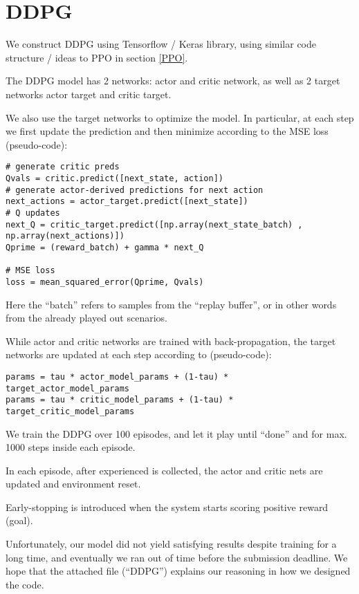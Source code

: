 \section{DDPG}\label{DDPG}

We construct DDPG using Tensorflow / Keras library, using similar code structure / ideas to PPO in section \ref{PPO}.

The DDPG model has 2 networks: actor and critic network, as well as 2 target networks actor target and critic target. 

We also use the target networks to optimize the model. In particular, at each step we first update the prediction and then minimize according to the MSE loss (pseudo-code):
\begin{lstlisting}
# generate critic preds
Qvals = critic.predict([next_state, action])
# generate actor-derived predictions for next action
next_actions = actor_target.predict([next_state])
# Q updates
next_Q = critic_target.predict([np.array(next_state_batch) , np.array(next_actions)])
Qprime = (reward_batch) + gamma * next_Q

# MSE loss
loss = mean_squared_error(Qprime, Qvals)
\end{lstlisting}

Here the ``batch'' refers to samples from the ``replay buffer'', or in other words from the already played out scenarios. 

While actor and critic networks are trained with back-propagation, the target networks are updated at each step according to (pseudo-code):
\begin{lstlisting}
params = tau * actor_model_params + (1-tau) * target_actor_model_params
params = tau * critic_model_params + (1-tau) * target_critic_model_params
\end{lstlisting}

We train the DDPG over 100 episodes, and let it play until ``done'' and for max. 1000 steps inside each episode.

In each episode, after experienced is collected, the actor and critic nets are updated and environment reset.

Early-stopping is introduced when the system starts scoring positive reward (goal).

Unfortunately, our model did not yield satisfying results despite training for a long time, and eventually we ran out of time before the submission deadline. We hope that the attached file (``DDPG'') explains our reasoning in how we designed the code.